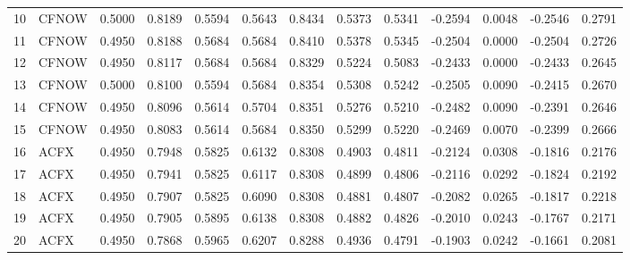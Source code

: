 \begin{tabular}{rlrrrrrrrrrrr}
    10 &  CFNOW &  0.5000 &          0.8189 &  0.5594 &            0.5643 &          0.8434 &     0.5373 &      0.5341 &          -0.2594 &         0.0048 &    -0.2546 &                          0.2791 \\
    11 &  CFNOW &  0.4950 &          0.8188 &  0.5684 &            0.5684 &          0.8410 &     0.5378 &      0.5345 &          -0.2504 &         0.0000 &    -0.2504 &                          0.2726 \\
    12 &  CFNOW &  0.4950 &          0.8117 &  0.5684 &            0.5684 &          0.8329 &     0.5224 &      0.5083 &          -0.2433 &         0.0000 &    -0.2433 &                          0.2645 \\
    13 &  CFNOW &  0.5000 &          0.8100 &  0.5594 &            0.5684 &          0.8354 &     0.5308 &      0.5242 &          -0.2505 &         0.0090 &    -0.2415 &                          0.2670 \\
    14 &  CFNOW &  0.4950 &          0.8096 &  0.5614 &            0.5704 &          0.8351 &     0.5276 &      0.5210 &          -0.2482 &         0.0090 &    -0.2391 &                          0.2646 \\
    15 &  CFNOW &  0.4950 &          0.8083 &  0.5614 &            0.5684 &          0.8350 &     0.5299 &      0.5220 &          -0.2469 &         0.0070 &    -0.2399 &                          0.2666 \\
    16 &   ACFX &  0.4950 &          0.7948 &  0.5825 &            0.6132 &          0.8308 &     0.4903 &      0.4811 &          -0.2124 &         0.0308 &    -0.1816 &                          0.2176 \\
    17 &   ACFX &  0.4950 &          0.7941 &  0.5825 &            0.6117 &          0.8308 &     0.4899 &      0.4806 &          -0.2116 &         0.0292 &    -0.1824 &                          0.2192 \\
    18 &   ACFX &  0.4950 &          0.7907 &  0.5825 &            0.6090 &          0.8308 &     0.4881 &      0.4807 &          -0.2082 &         0.0265 &    -0.1817 &                          0.2218 \\
    19 &   ACFX &  0.4950 &          0.7905 &  0.5895 &            0.6138 &          0.8308 &     0.4882 &      0.4826 &          -0.2010 &         0.0243 &    -0.1767 &                          0.2171 \\
    20 &   ACFX &  0.4950 &          0.7868 &  0.5965 &            0.6207 &          0.8288 &     0.4936 &      0.4791 &          -0.1903 &         0.0242 &    -0.1661 &                          0.2081 \\

\end{tabular}
